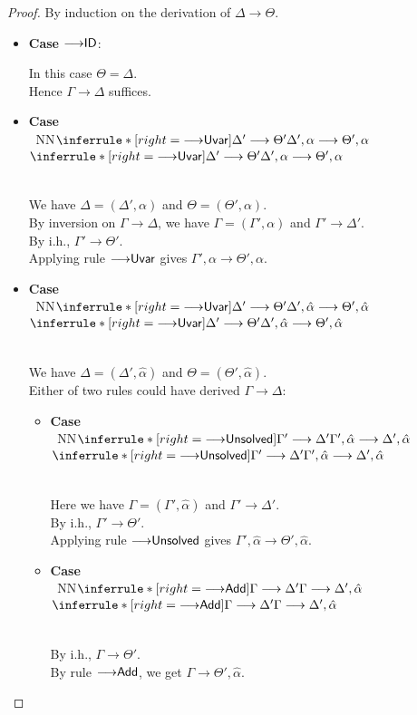 \documentclass[a4paper]{article}
\newcommand{\ProofCaseRule}[1]{\item \textbf{Case }\textrm{{#1}}: ~ }
\gdef\xxDerivationProofCaseColor{N}
\newcommand{\DerivationProofCase}[3]{\smallskip
     \item \parbox[t]{100ex}{\textbf{Case } \\[-0.5em]
       $~$\hspace{5ex}
       \if\xxDerivationProofCaseColor N\ensuremath{\Infer{#1}{#2}{#3}}
       \else \colorbox{\xxDerivationProofCaseColor}{\ensuremath{\Infer{#1}{#2}{#3}}}\fi }\nopagebreak \\[-0.8ex]
  }
\newcommand{\Infer}[3]{\inferrule*[right={\text{\strut#1}}]{{}#2\mathstrut}{{}#3\mathstrut}}
\newcommand{\extendssym}{\longrightarrow}
\newcommand{\extends}[2]{{#1} \extendssym {#2}}
\newcommand{\substextend}[2]{\extends{#1}{#2}}
\newcommand{\ahat}{\hat{\alpha}}
\newcommand{\rulename}[1]{\text{\normalfont\textsf{#1}}}
\newcommand{\substextendrulename}[1]{\ensuremath{{\extendssym}{\rulename{#1}}}\xspace}
\newcommand{\substextendId}{\substextendrulename{ID}}
\newcommand{\substextendUU}{\substextendrulename{Uvar}}
\newcommand{\substextendEE}{\substextendrulename{Unsolved}}
\newcommand{\substextendAdd}{\substextendrulename{Add}}
\begin{document}
\substextendtransitivity*
\begin{proof}
  By induction on the derivation of $\substextend{\Delta}{\Theta}$.

  \begin{itemize}
  \ProofCaseRule{\substextendId}
  
      In this case $\Theta = \Delta$. \\
      Hence $\substextend{\Gamma}{\Delta}$ suffices. 

  \DerivationProofCase{\substextendUU}
                      {\substextend{\Delta'}{\Theta'}}
                      {\substextend{\Delta', \alpha}{\Theta', \alpha}}

      We have $\Delta = (\Delta', \alpha)$ and $\Theta = (\Theta', \alpha)$. \\
      By inversion on $\substextend{\Gamma}{\Delta}$,
      we have $\Gamma = (\Gamma', \alpha)$ and $\substextend{\Gamma'}{\Delta'}$. \\
      By i.h., $\substextend{\Gamma'}{\Theta'}$. \\
      Applying rule \substextendUU gives $\substextend{\Gamma', \alpha}{\Theta', \alpha}$. 

  \DerivationProofCase{\substextendUU}
                      {\substextend{\Delta'}{\Theta'}}
                      {\substextend{\Delta', \ahat}{\Theta', \ahat}}

      We have $\Delta = (\Delta', \ahat)$ and $\Theta = (\Theta', \ahat)$. \\
      Either of two rules could have derived $\substextend{\Gamma}{\Delta}$:

      \begin{itemize}
          \DerivationProofCase{\substextendEE}
                              {\substextend{\Gamma'}{\Delta'}}
                              {\substextend{\Gamma', \ahat}{\Delta', \ahat}}

            Here we have $\Gamma = (\Gamma', \ahat)$ and $\substextend{\Gamma'}{\Delta'}$. \\
            By i.h., $\substextend{\Gamma'}{\Theta'}$. \\
            Applying rule \substextendEE gives $\substextend{\Gamma', \ahat}{\Theta', \ahat}$. 

          \DerivationProofCase{\substextendAdd}
                              {\substextend{\Gamma}{\Delta'}}
                              {\substextend{\Gamma}{\Delta', \ahat}}

            By i.h., $\substextend{\Gamma}{\Theta'}$. \\
            By rule \substextendAdd, we get $\substextend{\Gamma}{\Theta', \ahat}$. 
      \end{itemize}


\end{itemize}
\end{proof}
\end{document}

